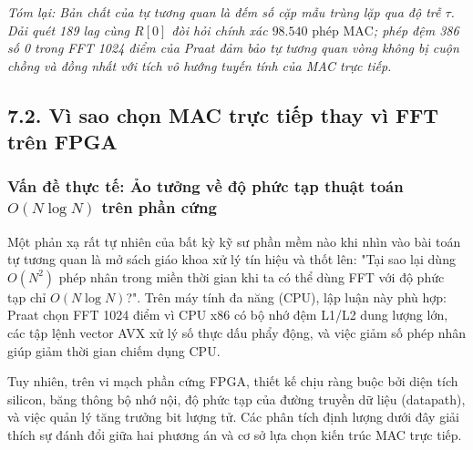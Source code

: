 \textit{Tóm lại: Bản chất của tự tương quan là đếm số cặp mẫu trùng lặp qua độ trễ $\tau$. Dải quét 189 lag cùng $R[0]$ đòi hỏi chính xác $98.540\text{ phép MAC}$; phép đệm 386 số 0 trong FFT 1024 điểm của Praat đảm bảo tự tương quan vòng không bị cuộn chồng và đồng nhất với tích vô hướng tuyến tính của MAC trực tiếp.}


\subsection*{7.2. Vì sao chọn MAC trực tiếp thay vì FFT trên FPGA}

\subsubsection*{Vấn đề thực tế: Ảo tưởng về độ phức tạp thuật toán $O(N \log N)$ trên phần cứng}
Một phản xạ rất tự nhiên của bất kỳ kỹ sư phần mềm nào khi nhìn vào bài toán tự tương quan là mở sách giáo khoa xử lý tín hiệu và thốt lên: "Tại sao lại dùng $O(N^2)$ phép nhân trong miền thời gian khi ta có thể dùng FFT với độ phức tạp chỉ $O(N \log N)$?". Trên máy tính đa năng (CPU), lập luận này phù hợp: Praat chọn FFT 1024 điểm vì CPU x86 có bộ nhớ đệm L1/L2 dung lượng lớn, các tập lệnh vector AVX xử lý số thực dấu phẩy động, và việc giảm số phép nhân giúp giảm thời gian chiếm dụng CPU.

Tuy nhiên, trên vi mạch phần cứng FPGA, thiết kế chịu ràng buộc bởi diện tích silicon, băng thông bộ nhớ nội, độ phức tạp của đường truyền dữ liệu (datapath), và việc quản lý tăng trưởng bit lượng tử. Các phân tích định lượng dưới đây giải thích sự đánh đổi giữa hai phương án và cơ sở lựa chọn kiến trúc MAC trực tiếp.

